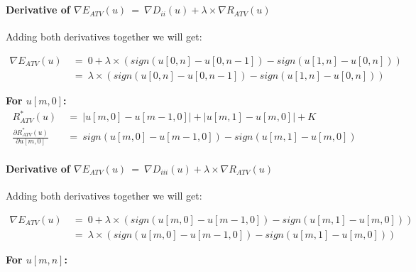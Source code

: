 \documentclass{report}
\begin{document}
\begin{enumerate}[(i)]
\begin{adjustwidth}{-6em}{}
\begin{align*}
						\end{align*}
						\vspace{-0.8cm} \paragraph{Derivative of $\nabla E_{ATV}(u) \ = \ \nabla D_{ii}(u) + \lambda \times \nabla R_{ATV}(u)$}
						\startsubsection
							Adding both derivatives together we will get:
						\closesection
						\begin{adjustwidth}{-6em}{}
							\vspace{-0.6cm}
							\begin{align*}
								\nabla E_{ATV}(u) \ & = \ 0 + \lambda \times (sign(u[0,n] - u[0,n-1]) - sign(u[1,n] - u[0,n])) \\
								& = \ \lambda \times (sign(u[0,n] - u[0,n-1]) - sign(u[1,n] - u[0,n]))
							\end{align*}
						\end{adjustwidth}
						\item \textbf{For $u[m,0]$:}
						\begin{align*}
							R_{ATV}^*(u) \ & = \ |u[m,0] - u[m-1,0]| + |u[m,1] - u[m,0]| + K \\
							\frac{\partial R_{ATV}^*(u)}{\partial u[m,0]} \ & = \ sign(u[m,0] - u[m-1,0]) - sign(u[m,1] - u[m,0])
						\end{align*}
						\vspace{-0.8cm} \paragraph{Derivative of $\nabla E_{ATV}(u) \ = \ \nabla D_{iii}(u) + \lambda \times \nabla R_{ATV}(u)$}
						\startsubsection
							Adding both derivatives together we will get:
						\closesection
						\begin{adjustwidth}{-6em}{}
							\vspace{-0.6cm}
							\begin{align*}
								\nabla E_{ATV}(u) \ & = \ 0 + \lambda \times (sign(u[m,0] - u[m-1,0]) - sign(u[m,1] - u[m,0])) \\
								& = \ \lambda \times (sign(u[m,0] - u[m-1,0]) - sign(u[m,1] - u[m,0]))
							\end{align*}
						\end{adjustwidth}
						\item \textbf{For $u[m,n]$:}
						\begin{adjustwidth}{-8em}{}
							\vspace{-0.5cm}

\end{adjustwidth}
\end{adjustwidth}
\end{enumerate}
\end{document}
